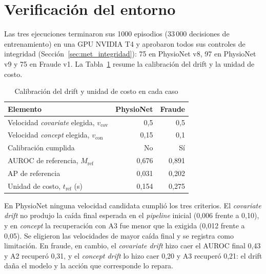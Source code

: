 \section{Verificación del entorno}
\label{sec:res_verificacion}

Las tres ejecuciones terminaron sus 1000 episodios (33\,000 decisiones de entrenamiento) en una
GPU NVIDIA T4 y aprobaron todos sus controles de integridad
(Sección~\ref{sec:met_integridad}): 75 en PhysioNet v8, 97 en PhysioNet v9 y 75 en Fraude v1.
La Tabla~\ref{tab:res_calibracion} resume la calibración del drift y la unidad de costo.

\begin{table}[H]
    \centering
    \caption{Calibración del drift y unidad de costo en cada caso}
    \label{tab:res_calibracion}
    \begin{tabular}{lrr}
        \toprule
        \textbf{Elemento} & \textbf{PhysioNet} & \textbf{Fraude} \\
        \midrule
        Velocidad \textit{covariate} elegida, $v_{\text{cov}}$ & 0,5 & 0,5 \\
        Velocidad \textit{concept} elegida, $v_{\text{con}}$   & 0,15 & 0,1 \\
        Calibración cumplida                                     & No & Sí \\
        AUROC de referencia, $M_{\text{ref}}$                    & 0,676 & 0,891 \\
        AP de referencia                                         & 0,031 & 0,202 \\
        Unidad de costo, $t_{\text{ref}}$ (s)                    & 0,154 & 0,275 \\
        \bottomrule
    \end{tabular}
\end{table}

En PhysioNet ninguna velocidad candidata cumplió los tres criterios. El \textit{covariate
drift} no produjo la caída final esperada en el \textit{pipeline} inicial (0,006 frente a 0,10),
y en \textit{concept} la recuperación con A3 fue menor que la exigida (0,012 frente a 0,05). Se
eligieron las velocidades de mayor caída final y se registra como limitación. En fraude, en
cambio, el \textit{covariate drift} hizo caer el AUROC final 0,43 y A2 recuperó 0,31, y el
\textit{concept drift} lo hizo caer 0,20 y A3 recuperó 0,21: el drift daña el modelo y la
acción que corresponde lo repara.


